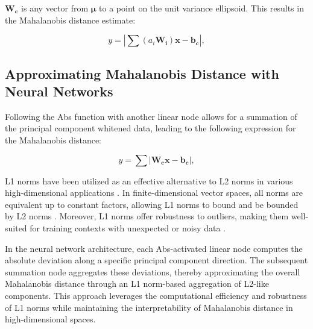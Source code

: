 $\boldsymbol{W_c}$ is any vector from $\boldsymbol{\mu}$ to a point on the unit variance ellipsoid. This results in the Mahalanobis distance estimate:

\begin{equation}
    \label{eq:mahalanobis_mixed}
    y = \left| \sum (a_i \mathbf{W_i}) \mathbf{x} - \mathbf{b_c} \right|,
\end{equation}

\subsection{Approximating Mahalanobis Distance with Neural Networks}

Following the Abs function with another linear node allows for a summation of the principal component whitened data, leading to the following expression for the Mahalanobis distance:

\begin{equation}
    \label{eq:mahalanobis_L1}
    y = \sum \left| \mathbf{W_c} \mathbf{x} - \mathbf{b_c} \right|,
\end{equation}

L1 norms have been utilized as an effective alternative to L2 norms in various high-dimensional applications \citep{garling1983banach, bernhardsson2018annoy}. In finite-dimensional vector spaces, all norms are equivalent up to constant factors, allowing L1 norms to bound and be bounded by L2 norms \citep{garling1983banach}. Moreover, L1 norms offer robustness to outliers, making them well-suited for training contexts with unexpected or noisy data \citep{candes2005decoding}. 

In the neural network architecture, each Abs-activated linear node computes the absolute deviation along a specific principal component direction. The subsequent summation node aggregates these deviations, thereby approximating the overall Mahalanobis distance through an L1 norm-based aggregation of L2-like components. This approach leverages the computational efficiency and robustness of L1 norms while maintaining the interpretability of Mahalanobis distance in high-dimensional spaces.
